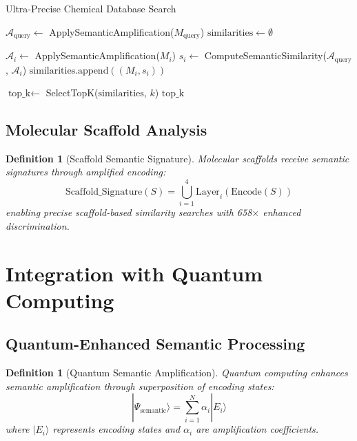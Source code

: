 \documentclass[12pt,a4paper]{article}
\newtheorem{definition}[theorem]{Definition}
\begin{document}
\begin{algorithm}[H]
\caption{Ultra-Precise Chemical Database Search}
\begin{algorithmic}[1]
    \State $\mathcal{A}_{\text{query}} \gets$ ApplySemanticAmplification($M_{\text{query}}$)
    \State $\text{similarities} \gets \emptyset$

        \State $\mathcal{A}_i \gets$ ApplySemanticAmplification($M_i$)
        \State $s_i \gets$ ComputeSemanticSimilarity($\mathcal{A}_{\text{query}}$, $\mathcal{A}_i$)
        \State $\text{similarities}.\text{append}((M_i, s_i))$
    \EndFor

    \State $\text{top\_k} \gets$ SelectTopK($\text{similarities}$, $k$)
    \State \Return $\text{top\_k}$
\EndProcedure
\end{algorithmic}
\end{algorithm}

\subsection{Molecular Scaffold Analysis}

\begin{definition}[Scaffold Semantic Signature]
Molecular scaffolds receive semantic signatures through amplified encoding:
\begin{equation}
\text{Scaffold\_Signature}(S) = \bigcup_{i=1}^{4} \text{Layer}_i(\text{Encode}(S))
\end{equation}
enabling precise scaffold-based similarity searches with 658$\times$ enhanced discrimination.
\end{definition}

\section{Integration with Quantum Computing}

\subsection{Quantum-Enhanced Semantic Processing}

\begin{definition}[Quantum Semantic Amplification]
Quantum computing enhances semantic amplification through superposition of encoding states:
\begin{equation}
|\Psi_{\text{semantic}}\rangle = \sum_{i=1}^{N} \alpha_i |E_i\rangle
\end{equation}
where $|E_i\rangle$ represents encoding states and $\alpha_i$ are amplification coefficients.
\end{definition}
\end{document}
